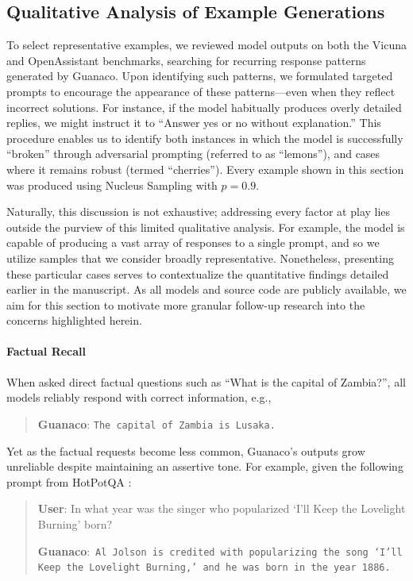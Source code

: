 \subsection{Qualitative Analysis of Example Generations}
\label{ssec:examples}

To select representative examples, we reviewed model outputs on both the Vicuna and OpenAssistant benchmarks, searching for recurring response patterns generated by {Guanaco}. Upon identifying such patterns, we formulated targeted prompts to encourage the appearance of these patterns—even when they reflect incorrect solutions. For instance, if the model habitually produces overly detailed replies, we might instruct it to ``Answer yes or no without explanation.'' This procedure enables us to identify both instances in which the model is successfully “broken” through adversarial prompting (referred to as ``lemons''), and cases where it remains robust (termed ``cherries''). Every example shown in this section was produced using Nucleus Sampling \cite{holtzmancurious} with $p=0.9$.

Naturally, this discussion is not exhaustive; addressing every factor at play lies outside the purview of this limited qualitative analysis. For example, the model is capable of producing a vast array of responses to a single prompt, and so we utilize samples that we consider broadly representative. Nonetheless, presenting these particular cases serves to contextualize the quantitative findings detailed earlier in the manuscript. As all models and source code are publicly available, we aim for this section to motivate more granular follow-up research into the concerns highlighted herein.

\paragraph{Factual Recall} When asked direct factual questions such as ``What is the capital of Zambia?'', all models reliably respond with correct information, e.g.,

\begin{quote}
    \textbf{Guanaco}:
    \texttt{The capital of Zambia is Lusaka.}
\end{quote}

Yet as the factual requests become less common, {Guanaco}'s outputs grow unreliable despite maintaining an assertive tone. For example, given the following prompt from HotPotQA \citep{yang2018hotpotqa}:

\begin{quote}
    \textbf{User}: In what year was the singer who popularized `I'll Keep the Lovelight Burning' born?  

    \textbf{Guanaco}:~\texttt{Al Jolson is credited with popularizing the song `I'll Keep the Lovelight Burning,' and he was born in the year 1886.}
\end{quote}


